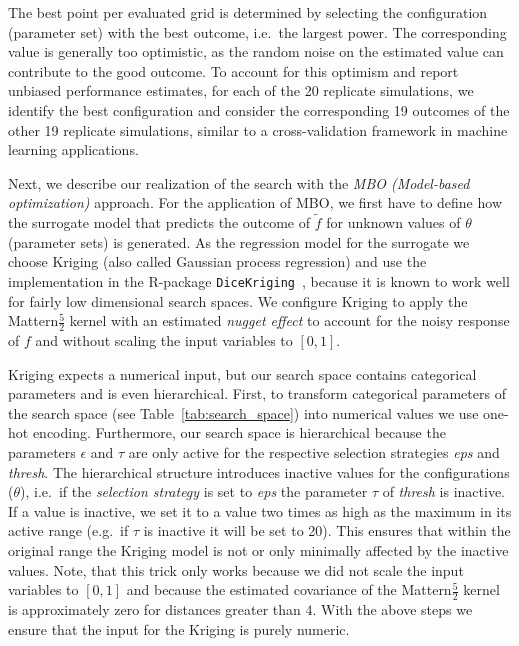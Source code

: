 \documentclass[bimj,fleqn]{w-art}
\theoremstyle{plain}
\theoremstyle{definition}
\begin{document}
The best point per evaluated grid is determined by selecting the configuration (parameter set) with the best outcome, i.e.\ the largest power.
The corresponding value is generally too optimistic, as the random noise on the estimated value can contribute to the good outcome.
To account for this optimism and report unbiased performance estimates, for each of the 20 replicate simulations, we identify the best configuration and consider the corresponding 19 outcomes of the other 19 replicate simulations, similar to a cross-validation framework in machine learning applications. 

Next, we describe our realization of the search with the \emph{MBO (Model-based optimization)} approach.
For the application of MBO, we first have to define how the surrogate model that predicts the outcome of $\tilde{f}$ for unknown values of $\theta$ (parameter sets) is generated.
As the regression model for the surrogate we choose Kriging (also called Gaussian process regression) and use the implementation in the R-package \texttt{DiceKriging}~\citep{roustant_dicekriging_2012}, because it is known to work well for fairly low dimensional search spaces.
We configure Kriging to apply the Mattern$\frac{5}{2}$ kernel with an estimated \emph{nugget effect} to account for the noisy response of $f$ and without scaling the input variables to $[0,1]$.

Kriging expects a numerical input, but our search space contains categorical parameters and is even hierarchical.
First, to transform categorical parameters of the search space (see Table~\ref{tab:search_space}) into numerical values we use one-hot encoding.
Furthermore, our search space is hierarchical because the parameters $\epsilon$ and $\tau$ are only active for the respective selection strategies \emph{eps} and \emph{thresh}.
The hierarchical structure introduces inactive values for the configurations ($\theta$), i.e.\ if the \emph{selection strategy} is set to \emph{eps} the parameter $\tau$ of \emph{thresh} is inactive.
If a value is inactive, we set it to a value two times as high as the maximum in its active range (e.g.\ if $\tau$ is inactive it will be set to 20).
This ensures that within the original range the Kriging model is not or only minimally affected by the inactive values.
Note, that this trick only works because we did not scale the input variables to $[0,1]$ and because the estimated covariance of the Mattern$\frac{5}{2}$ kernel is approximately zero for distances greater than $4$.
With the above steps we ensure that the input for the Kriging is purely numeric.
\end{document}

